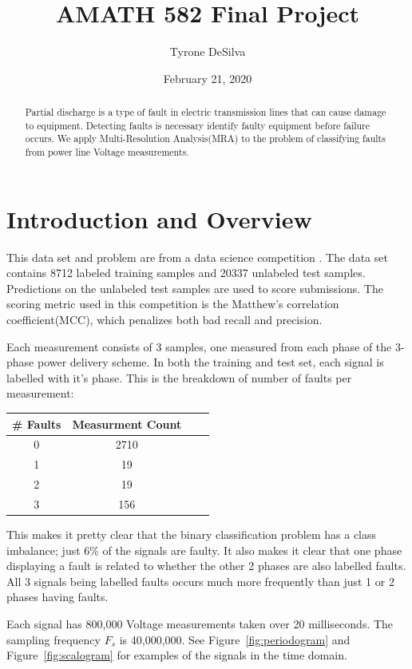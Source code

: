 \documentclass{article}
\title{AMATH 582 Final Project}
\author{Tyrone DeSilva}
\date{February 21, 2020}
\begin{document}
\maketitle

\begin{abstract}
    Partial discharge is a type of fault in electric transmission lines that can
    cause damage to equipment. Detecting faults is necessary identify faulty
    equipment before failure occurs. We apply Multi-Resolution Analysis(MRA) to
    the problem of classifying faults from power line Voltage measurements.
\end{abstract}

\section{Introduction and Overview}
This data set and problem are from a data science competition \cite{vsb_data}.
The data set contains 8712 labeled training samples and 20337 unlabeled test
samples. Predictions on the unlabeled test samples are used to score
submissions. The scoring metric used in this competition is the Matthew's
correlation coefficient(MCC), which penalizes both bad recall and precision.

Each measurement consists of 3 samples, one measured from each phase of the
3-phase power delivery scheme. In both the training and test set, each signal is
labelled with it's phase. This is the breakdown of number of faults per measurement:
\begin{center}
\begin{tabular}{ |c|c|c|c| } 
\hline
\# Faults & Measurment Count \\
\hline
0 & 2710 \\ 
1 & 19 \\
2 & 19 \\
3 & 156 \\
\hline
\end{tabular}
\end{center}

This makes it pretty clear that the binary classification problem has a class
imbalance; just 6\% of the signals are faulty.
It also makes it clear that one phase displaying a fault is related
to whether the other 2 phases are also labelled faults. All 3 signals being
labelled faults occurs much more frequently than just 1 or 2 phases having faults.

Each signal has 800,000 Voltage measurements taken over 20 milliseconds. The
sampling frequency $F_s$ is 40,000,000. See Figure~\ref{fig:periodogram} and
Figure~\ref{fig:scalogram} for examples of the signals in the time domain.
\end{document}
